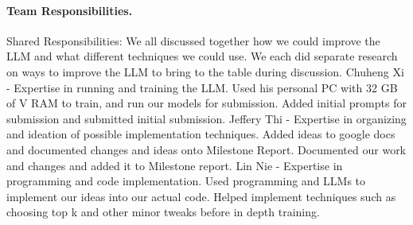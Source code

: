 \documentclass{article}
\begin{document}
\paragraph{Team Responsibilities.}
Shared Responsibilities: We all discussed together how we could improve the LLM and what different techniques we could use. We each did separate research on ways to improve the LLM to bring to the table during discussion.  \newline
\newline
Chuheng Xi - Expertise in running and training the LLM. Used his personal PC with 32 GB of V RAM to train, and run our models for submission. Added initial prompts for submission and submitted initial submission. \newline
\newline
Jeffery Thi - Expertise in organizing and ideation of possible implementation techniques. Added ideas to google docs and documented changes and ideas onto Milestone Report. Documented our work and changes and added it to Milestone report. \newline
\newline
Lin Nie - Expertise in programming and code implementation. Used programming and LLMs to implement our ideas into our actual code. Helped implement techniques such as choosing top k and other minor tweaks before in depth training. 
\end{document}

